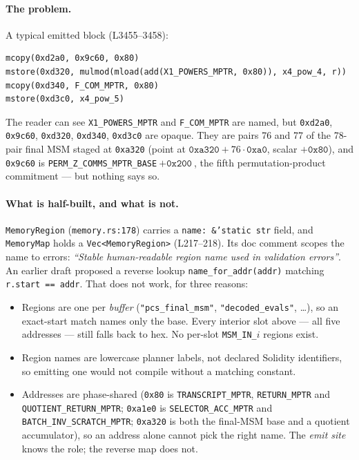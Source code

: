 \paragraph{The problem.} A typical emitted block (L3455--3458):

\begin{lstlisting}[style=yul]
mcopy(0xd2a0, 0x9c60, 0x80)
mstore(0xd320, mulmod(mload(add(X1_POWERS_MPTR, 0x80)), x4_pow_4, r))
mcopy(0xd340, F_COM_MPTR, 0x80)
mstore(0xd3c0, x4_pow_5)
\end{lstlisting}

The reader can see \texttt{X1\_POWERS\_MPTR} and \texttt{F\_COM\_MPTR}
are named, but \texttt{0xd2a0}, \texttt{0x9c60}, \texttt{0xd320},
\texttt{0xd340}, \texttt{0xd3c0} are opaque. They are pairs 76 and 77 of
the 78-pair final MSM staged at \texttt{0xa320} (point at
$\texttt{0xa320}+76\cdot\texttt{0xa0}$, scalar $+\texttt{0x80}$), and
\texttt{0x9c60} is \texttt{PERM\_\allowbreak{}Z\_\allowbreak{}COMMS\_\allowbreak{}MPTR\_\allowbreak{}BASE}${}+\texttt{0x200}$,
the fifth permutation-product commitment --- but nothing says so.

\paragraph{What is half-built, and what is not.} \texttt{MemoryRegion}
(\texttt{memory.rs:178}) carries a \texttt{name: \&'static str} field,
and \texttt{MemoryMap} holds a \texttt{Vec<MemoryRegion>} (L217--218). Its
doc comment scopes the name to errors: \emph{``Stable human-readable region
name used in validation errors''}. An earlier draft proposed a reverse lookup
\texttt{name\_\allowbreak{}for\_\allowbreak{}addr(addr)} matching \texttt{r.start == addr}. That does
not work, for three reasons:
\begin{itemize}[leftmargin=1.4em,itemsep=1pt]
\item Regions are one per \emph{buffer} (\texttt{"pcs\_final\_msm"},
  \texttt{"decoded\_evals"}, \ldots), so an exact-start match names only the
  base. Every interior slot above --- all five addresses --- still falls
  back to hex. No per-slot \texttt{MSM\_IN\_$i$} regions exist.
\item Region names are lowercase planner labels, not declared Solidity
  identifiers, so emitting one would not compile without a matching constant.
\item Addresses are phase-shared (\texttt{0x80} is \texttt{TRANSCRIPT\_MPTR},
  \texttt{RETURN\_MPTR} and \texttt{QUOTIENT\_\allowbreak{}RETURN\_\allowbreak{}MPTR};
  \texttt{0xa1e0} is \texttt{SELECTOR\_\allowbreak{}ACC\_\allowbreak{}MPTR} and
  \texttt{BATCH\_\allowbreak{}INV\_\allowbreak{}SCRATCH\_\allowbreak{}MPTR}; \texttt{0xa320} is both the final-MSM
  base and a quotient accumulator), so an address alone cannot pick the
  right name. The \emph{emit site} knows the role; the reverse map does not.
\end{itemize}

